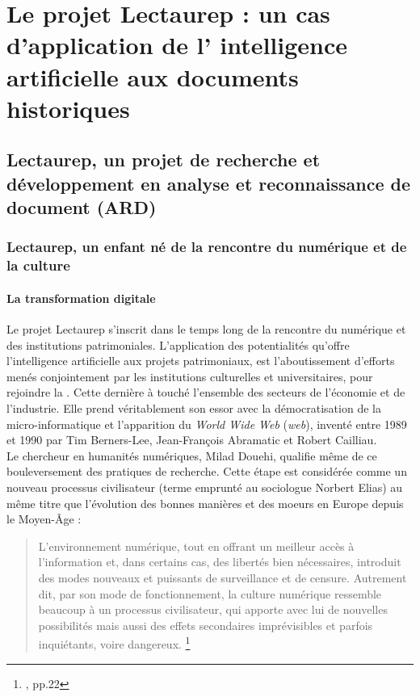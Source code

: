 \part{Le projet Lectaurep : un cas d'application de l' \og intelligence artificielle\fg{}  aux documents historiques}\label{partie_1}

\chapter{Lectaurep, un projet de recherche et développement en analyse et reconnaissance de document (ARD)}

\section{Lectaurep, un enfant né de la rencontre du numérique et de la culture}

\subsection{La transformation digitale}

Le projet Lectaurep s'inscrit dans le temps long de la rencontre du numérique et des institutions patrimoniales. L'application des potentialités qu'offre l'intelligence artificielle aux projets patrimoniaux, est l'aboutissement d'efforts menés conjointement par les institutions culturelles et universitaires, pour rejoindre la . Cette dernière à touché l'ensemble des secteurs de l'économie et de l'industrie. Elle prend véritablement son essor avec la démocratisation de la micro-informatique et l'apparition du \textit{World Wide Web} (\textit{web}), inventé entre 1989 et 1990 par Tim Berners-Lee, Jean-François Abramatic et Robert Cailliau.\\

Le chercheur en humanités numériques, Milad Douehi, qualifie même de  ce bouleversement des pratiques de recherche. Cette étape est considérée comme un nouveau processus civilisateur (terme emprunté au sociologue Norbert Elias) au même titre que l'évolution des bonnes manières et des moeurs en Europe depuis le Moyen-Âge : 

\begin{quote}
    L'environnement numérique, tout en offrant un meilleur accès à l'information et, dans certains cas, des libertés bien nécessaires, introduit des modes nouveaux et puissants de surveillance et de censure. Autrement dit, par son mode de fonctionnement, la culture numérique ressemble beaucoup à un processus civilisateur, qui apporte avec lui de nouvelles possibilités mais aussi des effets secondaires imprévisibles et parfois inquiétants, voire dangereux. \footnote{\cite{doueihi_grande_2011}, pp.22}
\end{quote}

